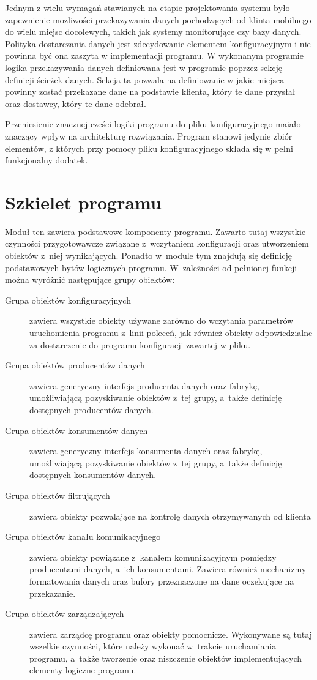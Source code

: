 Jednym z wielu wymagań stawianych na etapie projektowania systemu było
zapewnienie mozliwości przekazywania danych pochodzących od klinta
mobilnego do wielu miejsc docolewych, takich jak systemy monitorujące
czy bazy danych. Polityka dostarczania danych jest zdecydowanie
elementem konfiguracyjnym i nie powinna być ona zaszyta w
implementacji programu. W wykonanym programie logika przekazywania
danych definiowana jest w programie poprzez sekcję definicji ścieżek
danych. Sekcja ta pozwala na definiowanie w jakie miejsca powinny
zostać przekazane dane na podstawie klienta, który te dane przysłał
oraz dostawcy, który te dane odebrał.

Przeniesienie znacznej cześci logiki programu do pliku
konfiguracyjnego maiało znaczący wpływ na architekturę
rozwiązania. Program stanowi jedynie zbiór elementów, z których przy
pomocy pliku konfiguracyjnego składa się w pełni funkcjonalny dodatek.

\section[Szkielet programu][Szkielet programu]{Szkielet programu}

Moduł ten zawiera podstawowe komponenty programu. Zawarto tutaj
wszystkie czynności przygotowawcze związane z~wczytaniem konfiguracji
oraz utworzeniem obiektów z~niej wynikających. Ponadto w~module tym
znajdują się definicję podstawowych bytów logicznych
programu. W~zależności od pełnionej funkcji można wyróżnić następujące
grupy obiektów:

\begin{description}
\item[Grupa obiektów konfiguracyjnych] zawiera wszystkie obiekty
  używane zarówno do wczytania parametrów uruchomienia programu
  z~linii poleceń, jak również obiekty odpowiedzialne za dostarczenie
  do programu konfiguracji zawartej w pliku.
\item[Grupa obiektów producentów danych] \raggedright{zawiera generyczny interfejs
  producenta danych oraz fabrykę, umożliwiającą pozyskiwanie obiektów
  z~tej grupy, a~także definicję dostępnych producentów danych.}
\item[Grupa obiektów konsumentów danych] zawiera generyczny interfejs
  konsumenta danych oraz fabrykę, umożliwiającą pozyskiwanie obiektów
  z~tej grupy, a~także definicję dostępnych konsumentów danych.
\item[Grupa obiektów filtrujących] zawiera obiekty pozwalające na
  kontrolę danych otrzymywanych od klienta
\item[Grupa obiektów kanału komunikacyjnego] zawiera obiekty powiązane
  z~kanałem komunikacyjnym pomiędzy producentami danych, a~ich
  konsumentami. Zawiera również mechanizmy formatowania danych oraz
  bufory przeznaczone na dane oczekujące na przekazanie.
\item[Grupa obiektów zarządzających] zawiera zarządcę programu oraz
  obiekty pomocnicze. Wykonywane są tutaj wszelkie czynności, które
  należy wykonać w~trakcie uruchamiania programu, a~także tworzenie
  oraz niszczenie obiektów implementujących elementy logiczne
  programu.
\end{description}

